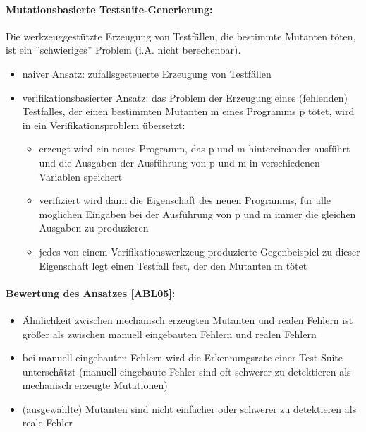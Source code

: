 \paragraph{Mutationsbasierte Testsuite-Generierung:}

Die werkzeuggestützte Erzeugung von Testfällen, die bestimmte Mutanten töten, ist ein ''schwieriges'' Problem (i.A. nicht berechenbar).

\begin{itemize}
	\item naiver Ansatz: zufallsgesteuerte Erzeugung von Testfällen
	\item verifikationsbasierter Ansatz: das Problem der Erzeugung eines (fehlenden) Testfalles, der einen bestimmten Mutanten m eines Programms p tötet, wird in ein Verifikationsproblem übersetzt:
	\begin{itemize}
		\item erzeugt wird ein neues Programm, das p und m  hintereinander ausführt und die Ausgaben der Ausführung von p und m in verschiedenen Variablen speichert
		\item verifiziert wird dann die Eigenschaft des neuen Programms, für alle möglichen Eingaben bei der Ausführung von p und m immer die gleichen Ausgaben zu produzieren
		\item jedes von einem Verifikationswerkzeug produzierte Gegenbeispiel zu dieser Eigenschaft legt einen Testfall fest, der den Mutanten m tötet
	\end{itemize}
\end{itemize}

\paragraph{Bewertung des Ansatzes [ABL05]:}
\begin{itemize}
	\item Ähnlichkeit zwischen mechanisch erzeugten Mutanten und realen Fehlern ist größer als zwischen manuell eingebauten Fehlern und realen Fehlern
	\item bei manuell eingebauten Fehlern wird die Erkennungsrate einer Test-Suite unterschätzt (manuell eingebaute Fehler sind oft schwerer zu detektieren als mechanisch erzeugte Mutationen)
	\item (ausgewählte) Mutanten sind nicht einfacher oder schwerer zu detektieren als reale Fehler
\end{itemize}

